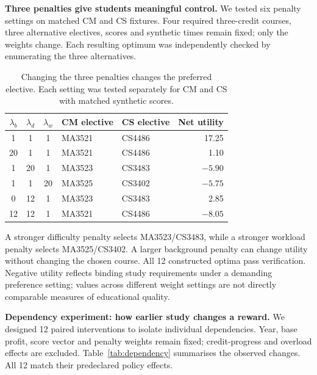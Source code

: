 \documentclass{article}
\begin{document}
\textbf{Three penalties give students meaningful control.} We tested six penalty settings on matched CM and CS fixtures. Four required three-credit courses, three alternative electives, scores and synthetic times remain fixed; only the weights change. Each resulting optimum was independently checked by enumerating the three alternatives.

\begin{table}[H]
\centering\small
\caption{Changing the three penalties changes the preferred elective. Each setting was tested separately for CM and CS with matched synthetic scores.}
\begin{tabular}{cccp{1.05in}p{1.05in}r}
\toprule
$\lambda_b$ & $\lambda_d$ & $\lambda_w$ & CM elective & CS elective & Net utility\\
\midrule
1 & 1 & 1 & MA3521 & CS4486 & 17.25\\
20 & 1 & 1 & MA3521 & CS4486 & 1.10\\
1 & 20 & 1 & MA3523 & CS3483 & $-5.90$\\
1 & 1 & 20 & MA3525 & CS3402 & $-5.75$\\
0 & 12 & 1 & MA3523 & CS3483 & 2.85\\
12 & 12 & 1 & MA3521 & CS4486 & $-8.05$\\
\bottomrule
\end{tabular}
\label{tab:lambda}
\end{table}

A stronger difficulty penalty selects MA3523/CS3483, while a stronger workload penalty selects MA3525/CS3402. A larger background penalty can change utility without changing the chosen course. All 12 constructed optima pass verification. Negative utility reflects binding study requirements under a demanding preference setting; values across different weight settings are not directly comparable measures of educational quality.

\textbf{Dependency experiment: how earlier study changes a reward.} We designed 12 paired interventions to isolate individual dependencies. Year, base profit, score vector and penalty weights remain fixed; credit-progress and overload effects are excluded. Table~\ref{tab:dependency} summarises the observed changes. All 12 match their predeclared policy effects.
\end{document}
